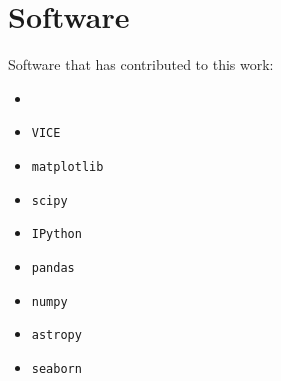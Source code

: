 \documentclass[12pt,oneside,letterpaper]{report}
\newcommand{\VICE}{\texttt{VICE}}
\begin{document}
\newpage

\section{Software}

Software that has contributed to this work:

\begin{itemize}
    \item \citet{OhioSupercomputerCenter1987}
    \item \VICE~\citep{JW20, james+21}
    \item \texttt{matplotlib} \citep{matplotlib}
    \item \texttt{scipy} \citep{scipy}
    \item \texttt{IPython} \citep{ipy}
    \item \texttt{pandas} \citep{pandas}
    \item \texttt{numpy} \citep{numpy}
    \item \texttt{astropy} \citep{astropy:2013, astropy:2018, astropy:2022}
    \item \texttt{seaborn}
\end{itemize}




\glsaddall

\printglossary[type=symbols,nonumberlist]

\printglossary
\end{document}
